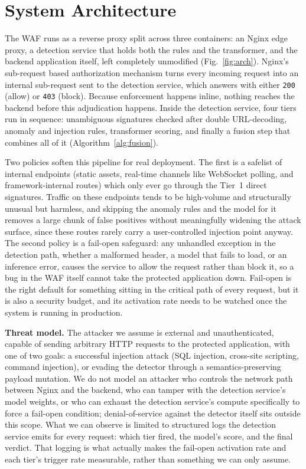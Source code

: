 \documentclass[conference]{IEEEtran}
\begin{document}
\section{System Architecture}
The WAF runs as a reverse proxy split across three containers: an Nginx edge
proxy, a detection service that holds both the rules and the transformer,
and the backend application itself, left completely unmodified
(Fig.~\ref{fig:arch}). Nginx's sub-request based authorization mechanism
turns every incoming request into an internal sub-request sent to the
detection service, which answers with either \texttt{200} (allow) or \texttt{403}
(block). Because enforcement happens inline, nothing reaches the backend
before this adjudication happens. Inside the detection service, four tiers
run in sequence: unambiguous signatures checked after double URL-decoding,
anomaly and injection rules, transformer scoring, and finally a fusion step
that combines all of it (Algorithm~\ref{alg:fusion}).

Two policies soften this pipeline for real deployment. The first is a
safelist of internal endpoints (static assets, real-time channels like
WebSocket polling, and framework-internal routes) which only ever go
through the Tier~1 direct signatures. Traffic on these endpoints tends to
be high-volume and structurally unusual but harmless, and skipping the
anomaly rules and the model for it removes a large chunk of false
positives without meaningfully widening the attack surface, since these
routes rarely carry a user-controlled injection point anyway. The second
policy is a fail-open safeguard: any unhandled exception in the detection
path, whether a malformed header, a model that fails to load, or an
inference error, causes the service to allow the request rather than
block it, so a bug in the WAF itself cannot take the protected
application down. Fail-open is the right default for something sitting
in the critical path of every request, but it is also a security budget,
and its activation rate needs to be watched once the system is running
in production.

\textbf{Threat model.} The attacker we assume is external and
unauthenticated, capable of sending arbitrary HTTP requests to the
protected application, with one of two goals: a successful injection
attack (SQL injection, cross-site scripting, command injection), or
evading the detector through a semantics-preserving payload mutation. We
do not model an attacker who controls the network path between Nginx and
the backend, who can tamper with the detection service's model weights,
or who can exhaust the detection service's compute specifically to force
a fail-open condition; denial-of-service against the detector itself
sits outside this scope. What we can observe is limited to structured
logs the detection service emits for every request: which tier fired, the
model's score, and the final verdict. That logging is what actually makes
the fail-open activation rate and each tier's trigger rate measurable,
rather than something we can only assume.
\end{document}
